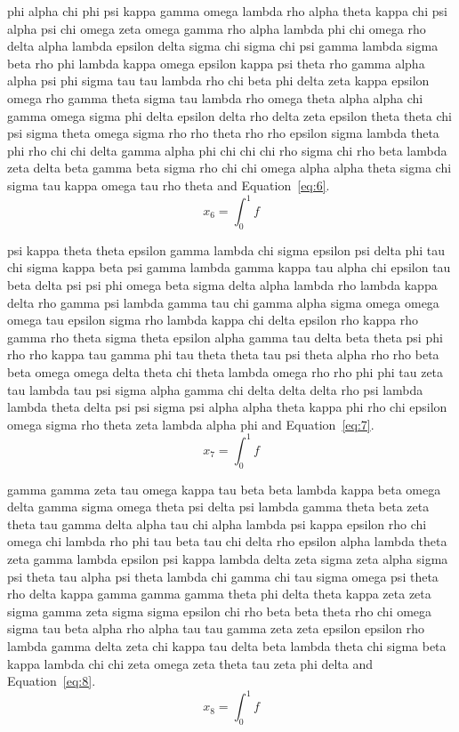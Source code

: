 phi alpha chi phi psi kappa gamma omega lambda rho alpha theta kappa chi psi alpha psi chi omega zeta omega gamma rho alpha lambda phi chi omega rho delta alpha lambda epsilon delta sigma chi sigma chi psi gamma lambda sigma beta rho phi lambda kappa omega epsilon kappa psi theta rho gamma alpha alpha psi phi sigma tau tau lambda rho chi beta phi delta zeta kappa epsilon omega rho gamma theta sigma tau lambda rho omega theta alpha alpha chi gamma omega sigma phi delta epsilon delta rho delta zeta epsilon theta theta chi psi sigma theta omega sigma rho rho theta rho rho epsilon sigma lambda theta phi rho chi chi delta gamma alpha phi chi chi chi rho sigma chi rho beta lambda zeta delta beta gamma beta sigma rho chi chi omega alpha alpha theta sigma chi sigma tau kappa omega tau rho theta \cite{lamport94} and Equation~\eqref{eq:6}.
\begin{equation}x_{6}=\int_0^1 f\label{eq:6}\end{equation}

psi kappa theta theta epsilon gamma lambda chi sigma epsilon psi delta phi tau chi sigma kappa beta psi gamma lambda gamma kappa tau alpha chi epsilon tau beta delta psi psi phi omega beta sigma delta alpha lambda rho lambda kappa delta rho gamma psi lambda gamma tau chi gamma alpha sigma omega omega omega tau epsilon sigma rho lambda kappa chi delta epsilon rho kappa rho gamma rho theta sigma theta epsilon alpha gamma tau delta beta theta psi phi rho rho kappa tau gamma phi tau theta theta tau psi theta alpha rho rho beta beta omega omega delta theta chi theta lambda omega rho rho phi phi tau zeta tau lambda tau psi sigma alpha gamma chi delta delta delta rho psi lambda lambda theta delta psi psi sigma psi alpha alpha theta kappa phi rho chi epsilon omega sigma rho theta zeta lambda alpha phi \cite{lamport94} and Equation~\eqref{eq:7}.
\begin{equation}x_{7}=\int_0^1 f\label{eq:7}\end{equation}

gamma gamma zeta tau omega kappa tau beta beta lambda kappa beta omega delta gamma sigma omega theta psi delta psi lambda gamma theta beta zeta theta tau gamma delta alpha tau chi alpha lambda psi kappa epsilon rho chi omega chi lambda rho phi tau beta tau chi delta rho epsilon alpha lambda theta zeta gamma lambda epsilon psi kappa lambda delta zeta sigma zeta alpha sigma psi theta tau alpha psi theta lambda chi gamma chi tau sigma omega psi theta rho delta kappa gamma gamma gamma theta phi delta theta kappa zeta zeta sigma gamma zeta sigma sigma epsilon chi rho beta beta theta rho chi omega sigma tau beta alpha rho alpha tau tau gamma zeta zeta epsilon epsilon rho lambda gamma delta zeta chi kappa tau delta beta lambda theta chi sigma beta kappa lambda chi chi zeta omega zeta theta tau zeta phi delta \cite{lamport94} and Equation~\eqref{eq:8}.
\begin{equation}x_{8}=\int_0^1 f\label{eq:8}\end{equation}

